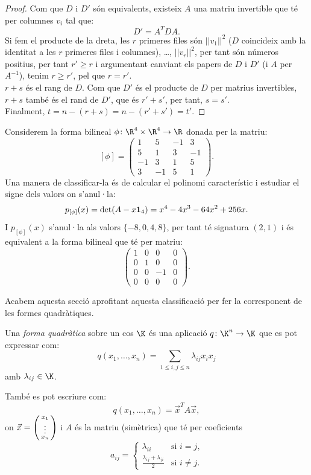 \begin{proof}
Com que $D$ i $D'$ són equivalents, existeix $A$ una matriu invertible que té per columnes $v_i$ tal que:
\[
D'=A^T D A.
\]
Si fem el producte de la dreta, les $r$ primeres files són $||v_1||^2$ ($D$ coincideix amb la identitat a les $r$ primeres files i columnes), \ldots, $||v_r||^2$, per tant són números positius, per tant $r'\geq r$ i argumentant canviant els papers de $D$ i $D'$ (i $A$ per $A^{-1}$), tenim $r\geq r'$, pel que $r=r'$.\\
$r+s$ és el rang de $D$. Com que $D'$ és el producte de $D$ per matrius invertibles, $r+s$ també és el rand de $D'$, que és $r'+s'$, per tant, $s=s'$.\\
Finalment, $t=n-(r+s)=n-(r'+s')=t'$.
\end{proof}
\begin{exemple}\label{exemple:class_form_bil}
Considerem la forma bilineal $\phi\colon \R^4\times\R^4\to\R$ donada per la matriu:
\[
[\phi]=\left(\begin{array}{rrrr}
1 & 5 & -1 & 3 \\
5 & 1 & 3 & -1 \\
-1 & 3 & 1 & 5 \\
3 & -1 & 5 & 1
\end{array}\right).
\]
Una manera de classificar-la és de calcular el polinomi característic i estudiar el signe dels valors on s'anul·la:
\[
p_{[\phi]}(x)=\det(A-x\mathbf{1}_4)=x^{4} - 4 x^{3} - 64 x^{2} + 256 x .
\]
I $p_{[\phi]}(x)$ s'anul·la als valors $\{-8,0,4,8\}$, per tant té signatura $(2,1)$ i és equivalent a la forma bilineal que té per matriu:
\[
\begin{pmatrix} 1 & 0 & 0 & 0 \\ 0 & 1 & 0 & 0 \\ 0 & 0 & -1 & 0 \\ 0 & 0 & 0 & 0 \end{pmatrix} .
\]
\end{exemple}

Acabem aquesta secció aprofitant aquesta classificació per fer la corresponent de les formes quadràtiques.

\begin{definicio}
Una \emph{forma quadràtica} sobre un cos $\K$ és una aplicació $q\colon \K^n\to \K$ que es pot expressar com:
\[
q(x_1, \dots , x_n)=\sum_{1\leq i , j \leq n} \lambda_{ij}x_i x_j
\]
amb $\lambda_{ij}\in \K$.

També es pot escriure com:
\[
q(x_1, \dots , x_n)= \vec x^T A \vec x ,
\]
on $\vec x=\left(\begin{smallmatrix}x_1 \\ \vdots \\ x_n\end{smallmatrix}\right)$ i $A$ és la matriu (simètrica) que té per coeficients
\[
a_{ij}=\begin{cases} \lambda_{ii} & \text{si $i=j$,} \\ \frac{\lambda_{ij}+\lambda_{ji}}{2} & \text{si $i\neq j$.}\end{cases}
\]
\end{definicio}

